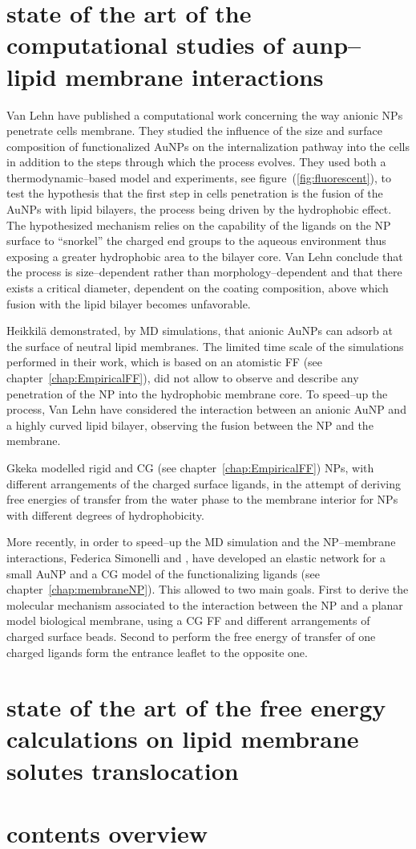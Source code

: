 \tocless\section{state of the art of the computational studies of aunp--lipid membrane interactions}
Van Lehn \etal \cite{VanLehn2013} have published a computational work concerning the way anionic \acp{NP} penetrate cells membrane. They studied the influence of the size and surface composition of functionalized \acp{AuNP} on the internalization pathway into the cells in addition to the steps through which the process evolves. They used both a thermodynamic--based model and experiments, see figure~(\ref{fig:fluorescent}), to test the hypothesis that the first step in cells penetration is the fusion of the \acp{AuNP} with lipid bilayers, the process being driven by the hydrophobic effect. The hypothesized mechanism relies on the capability of the ligands on the \ac{NP} surface to ``snorkel'' the charged end groups to the aqueous environment thus exposing a greater hydrophobic area to the bilayer core. Van Lehn \etal conclude that the process is size--dependent rather than morphology--dependent and that there exists a critical diameter, dependent on the coating composition, above which fusion with the lipid bilayer becomes unfavorable.

Heikkilä \etal \cite{Heikkila2014} demonstrated, by \ac{MD} simulations, that anionic \acp{AuNP} can adsorb at the surface of neutral lipid membranes. The limited time scale of the simulations performed in their work, which is based on an atomistic \ac{FF} (see chapter~\ref{chap:EmpiricalFF}), did not allow to observe and describe any penetration of the \ac{NP} into the hydrophobic membrane core. To speed--up the process, Van Lehn \etal \cite{VanLehn2014} have considered the interaction between an anionic \ac{AuNP} and a highly curved lipid bilayer, observing the fusion between the \ac{NP} and the membrane.

Gkeka \etal modelled rigid \cite{Gkeka2013} and \ac{CG} \cite{Gkeka2014} (see chapter~\ref{chap:EmpiricalFF}) \acp{NP}, with different arrangements of the charged surface ligands, in the attempt of deriving free energies of transfer from the water phase to the membrane interior for \acp{NP} with different degrees of hydrophobicity.

More recently, in order to speed--up the \ac{MD} simulation and the \ac{NP}--membrane interactions, Federica Simonelli \etal \cite{simonelliThesis} and \cite{ourPaper}, have developed an elastic network for a small \ac{AuNP} and a \ac{CG} model of the functionalizing ligands (see chapter~\ref{chap:membraneNP}). This allowed to two main goals. First to derive the molecular mechanism associated to the interaction between the \ac{NP} and a planar model biological membrane, using a \ac{CG} \ac{FF} and different arrangements of charged surface beads. Second to perform the free energy of transfer of one charged ligands form the entrance leaflet to the opposite one. 


\tocless\section{state of the art of the free energy calculations on lipid membrane solutes translocation}


\tocless\section{contents overview}


\endgroup